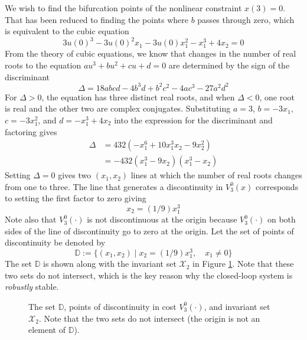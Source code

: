 \documentclass{article}
\newcommand{\bbD}{\mathbb{D}}
\newcommand{\eqbyd}{:=}
\begin{document}
We wish to find the bifurcation points of the nonlinear constraint
$x(3)=0$.  That has been reduced to finding the points where $b$
passes through zero, which is equivalent to the cubic equation
\begin{equation*}
3u(0)^3 - 3u(0)^2x_1 - 3u(0)x_1^2 -x_1^3 + 4x_2 = 0
\end{equation*}
From the theory of cubic equations, we know that changes in the number
of real roots to the equation $au^3+bu^2+cu+d=0$ are determined by the
sign of the discriminant 
\begin{equation*}
\Delta = 18 abcd - 4b^3d + b^2c^2 -4ac^3 -27 a^2 d^2
\end{equation*}
For $\Delta>0$, the equation has three distinct real roots, and when
$\Delta<0$, one root is real and the other two are complex
conjugates.  Substituting $a=3$, $b=-3x_1$, $c=-3x_1^2$, and
$d=-x_1^3+4x_2$ into the expression for the discriminant and factoring
gives 
\begin{align*}
\Delta &= 432 (-x_1^6 + 10 x_1^3x_2 - 9 x_2^2)\\
       &= -432 (x_1^3 - 9 x_2)(x_1^3 -x_2)
\end{align*}
Setting $\Delta=0$ gives two $(x_1, x_2)$ lines at which the number
of real roots changes from one to three. The line that generates a discontinuity in
$V_3^0(x)$ corresponds to setting the first factor to zero giving
\begin{equation*}
x_2 = (1/9) x_1^3
\end{equation*}
Note also that $V_3^0(\cdot)$ is not discontinuous at the origin
because $V_3^0(\cdot)$ on both sides of the line of  discontinuity
go to zero at the origin. Let the set of points of discontinuity be denoted by
\begin{equation*}
\bbD \eqbyd \{ (x_1, x_2) \mid x_2 = (1/9) x_1^3, \quad x_1 \neq 0 \}
\end{equation*}
The set $\bbD$ is shown along with the invariant set $\mathcal{X}_2$
in Figure \ref{fig:discontinuities}.  Note that these two sets do not
intersect, which is the key reason why the closed-loop system is
\textit{robustly} stable.
\begin{figure}
\centering
\resizebox{0.9\textwidth}{!}{}
\caption{The set $\bbD$, points of discontinuity in cost $V_3^0(\cdot)$,
  and invariant set $\mathcal{X}_2$. Note that the two sets
  do not intersect (the origin is not an element of $\bbD$).}
\label{fig:discontinuities}
\end{figure} 



% 
% 
\end{document}
